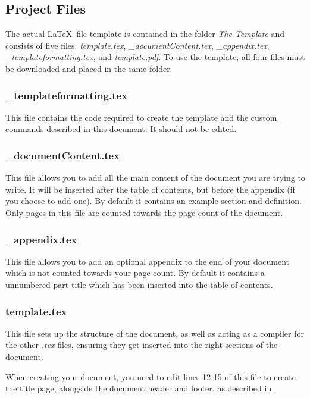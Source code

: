 \subsection{Project Files}

The actual \LaTeX\ file template is contained in the folder \textit{The Template} and consists of five files: \textit{template.tex}, \textit{\_documentContent.tex}, \textit{\_appendix.tex}, \textit{\_templateformatting.tex}, and \textit{template.pdf}. To use the template, all four files must be downloaded and placed in the same folder. 

\subsubsection{\_templateformatting.tex}

This file contains the code required to create the template and the custom commands described in this document. It should not be edited.

\subsubsection{\_documentContent.tex}

This file allows you to add all the main content of the document you are trying to write. It will be inserted after the table of contents, but before the appendix (if you choose to add one). By default it contains an example section and definition. Only pages in this file are counted towards the page count of the document.

\subsubsection{\_appendix.tex}

This file allows you to add an optional appendix to the end of your document which is not counted towards your page count. By default it contains a unnumbered part title which has been inserted into the table of contents.  

\subsubsection{template.tex}

This file sets up the structure of the document, as well as acting as a compiler for the other \textit{.tex} files, ensuring they get inserted into the right sections of the document.

When creating your document, you need to edit lines 12-15 of this file to create the title page, alongside the document header and footer, as described in . 


